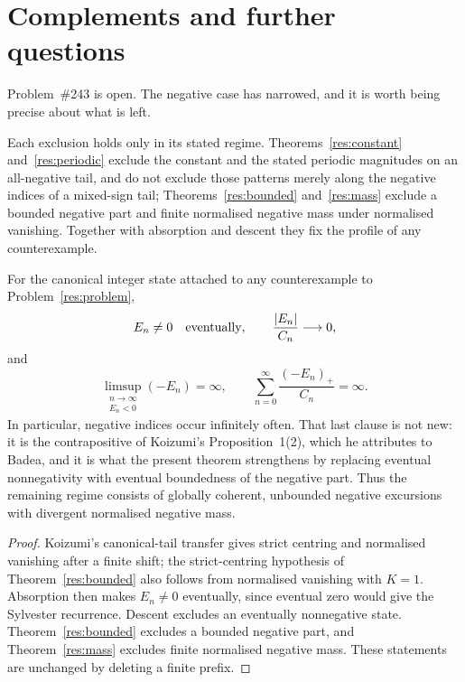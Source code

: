 \section{Complements and further questions}\label{sec:open}

Problem~\#243 is open.  The negative case has narrowed, and it is worth being
precise about what is left.

Each exclusion holds only in its stated regime.  Theorems~\ref{res:constant}
and~\ref{res:periodic} exclude the constant and the stated periodic magnitudes
on an all-negative tail, and do not exclude those patterns merely along the
negative indices of a mixed-sign tail; Theorems~\ref{res:bounded}
and~\ref{res:mass} exclude a bounded negative part and finite normalised
negative mass under normalised vanishing.  Together with absorption and descent
they fix the profile of any counterexample.

\begin{proposition}\label{res:frontier}
For the canonical integer state attached to any counterexample to
Problem~\ref{res:problem},
\[
 E_n\ne0\quad\hbox{eventually},\qquad
 \frac{|E_n|}{C_n}\longrightarrow0,
\]
and
\[
 \limsup_{\substack{n\to\infty\\E_n<0}}(-E_n)=\infty,
 \qquad
 \sum_{n=0}^{\infty}\frac{(-E_n)_+}{C_n}=\infty .
\]
In particular, negative indices occur infinitely often.  That last clause is
not new: it is the contrapositive of Koizumi's Proposition~1(2), which he
attributes to Badea, and it is what the present theorem strengthens by
replacing eventual nonnegativity with eventual boundedness of the negative
part.  Thus the remaining
regime consists of globally coherent, unbounded negative excursions with
divergent normalised negative mass.
\end{proposition}

\begin{proof}
Koizumi's canonical-tail transfer gives strict centring and normalised
vanishing after a finite shift; the strict-centring hypothesis of
Theorem~\ref{res:bounded} also follows from normalised vanishing with $K=1$.
Absorption then makes $E_n\ne0$ eventually,
since eventual zero would give the Sylvester recurrence.  Descent excludes an
eventually nonnegative state.  Theorem~\ref{res:bounded} excludes a bounded
negative part, and Theorem~\ref{res:mass} excludes finite normalised negative
mass.  These statements are unchanged by deleting a finite prefix.
\end{proof}

